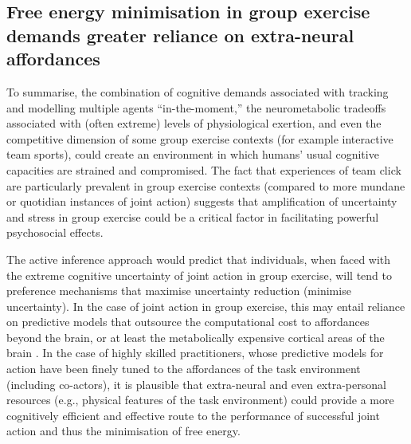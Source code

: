 \begin{CJK}{UTF8}{gbsn}
    \subsection{Free energy minimisation in group exercise demands greater reliance on extra-neural affordances \label{sect:extraNeural}}
    To summarise, the combination of cognitive demands associated with tracking and modelling multiple agents ``in-the-moment,'' the neurometabolic tradeoffs associated with (often extreme) levels of physiological exertion, and even the competitive dimension of some group exercise contexts (for example interactive team sports), could create an environment in which humans' usual cognitive capacities are strained and compromised.  The fact that experiences of team click are particularly prevalent in group exercise contexts (compared to more mundane or quotidian instances of joint action) suggests that amplification of uncertainty and stress in group exercise could be a critical factor in facilitating powerful psychosocial effects.

    The active inference approach would predict that individuals, when faced with the extreme cognitive uncertainty of joint action in group exercise, will tend to preference mechanisms that maximise uncertainty reduction (minimise uncertainty).  In the case of joint action in group exercise, this may entail reliance on predictive models that outsource the computational cost to affordances beyond the brain, or at least the metabolically expensive cortical areas of the brain \citep{Dietrich2004,Clark2015}.  In the case of highly skilled practitioners, whose predictive models for action have been finely tuned to the affordances of the task environment (including co-actors), it is plausible that extra-neural and even extra-personal resources (e.g., physical features of the task environment) could provide a more cognitively efficient and effective route to the performance of successful joint action and thus the minimisation of free energy.


\end{CJK}
